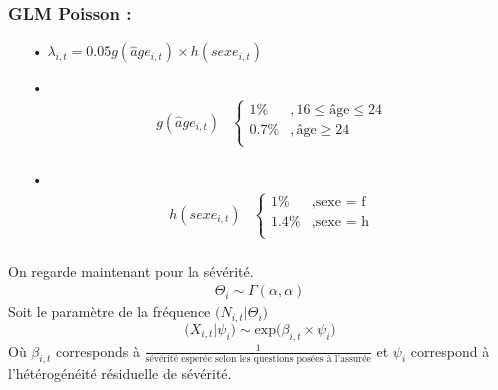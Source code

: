 \documentclass[11pt,french]{report}
\begin{document}
\subsubsection*{GLM Poisson :}
\begin{itemize}
\item[•] $\lambda_{i,t} = 0.05 g(\widehat{a}ge_{i,t}) \times h(sexe_{i,t})$
\item[•] \begin{align*}
g(\widehat{a}ge_{i,t}) & \left\{
     \begin{array}{rl}
      1 \% &, 16 \leq \text{âge} \leq 24\\
      0.7 \% &, \text{âge} \geq 24 \\
     \end{array}
     \right. \\
\end{align*}
\item[•] \begin{align*}
h(sexe_{i,t}) & \left\{
     \begin{array}{rl}
      1 \% &, \text{sexe = f} \\
      1.4 \% &, \text{sexe = h}  \\
     \end{array}
     \right. \\
\end{align*}
\end{itemize}
On regarde maintenant pour la sévérité.
\begin{align*}
\Theta_i \sim \Gamma(\alpha, \alpha)
\end{align*}
Soit le paramètre de la fréquence $\Big( N_{i,t}|\Theta_i \Big)$
\begin{equation}
\label{eq:exemple:bayes}
\Bigg( X_{i,t}|\psi_i \Bigg) \sim \text{exp} \Big( \beta _{i,t} \times \psi_i \Big) 
\end{equation}
Où $\beta _{i,t}$ corresponds à $\frac{1}{\text{sévérité esperée selon les questions posées à l'assurée}}$ et $\psi_i$ correspond à l'hétérogénéité résiduelle de sévérité.
\end{document}
